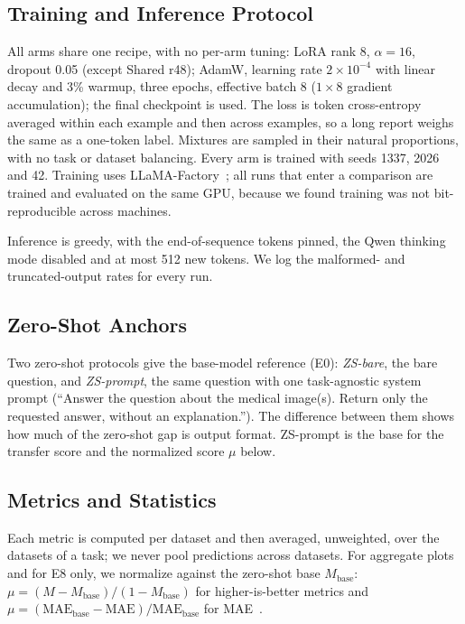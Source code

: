 \documentclass[journal,twoside,web]{ieeecolor}
\begin{document}
\subsection{Training and Inference Protocol}

All arms share one recipe, with no per-arm tuning: LoRA rank 8, $\alpha=16$,
dropout 0.05 (except Shared r48); AdamW, learning rate $2\times10^{-4}$ with
linear decay and 3\% warmup, three epochs, effective batch 8
($1\times8$ gradient accumulation); the final checkpoint is used. The loss is
token cross-entropy averaged within each example and then across examples,
so a long report weighs the same as a one-token label. Mixtures are sampled
in their natural proportions, with no task or dataset balancing. Every arm
is trained with seeds 1337, 2026 and 42. Training uses
LLaMA-Factory~\cite{zheng2024llamafactory}; all runs that enter a comparison
are trained and evaluated on the same GPU, because we found training was
not bit-reproducible across machines.

Inference is greedy, with the end-of-sequence tokens pinned, the Qwen
thinking mode disabled and at most 512 new tokens. We log the malformed-
and truncated-output rates for every run.

\subsection{Zero-Shot Anchors}

Two zero-shot protocols give the base-model reference (E0): \emph{ZS-bare},
the bare question, and \emph{ZS-prompt}, the same question with one
task-agnostic system prompt (``Answer the question about the medical
image(s). Return only the requested answer, without an explanation.''). The
difference between them shows how much of the zero-shot gap is output
format. ZS-prompt is the base for the transfer score and the normalized
score $\mu$ below.

\subsection{Metrics and Statistics}

Each metric is computed per dataset and then averaged, unweighted, over the
datasets of a task; we never pool predictions across datasets. For
aggregate plots and for E8 only, we normalize against the zero-shot base
$M_{\mathrm{base}}$: $\mu=(M-M_{\mathrm{base}})/(1-M_{\mathrm{base}})$ for
higher-is-better metrics and
$\mu=(\mathrm{MAE}_{\mathrm{base}}-\mathrm{MAE})/\mathrm{MAE}_{\mathrm{base}}$
for MAE~\cite{sachdeva2026tasktransfer}.
\end{document}
